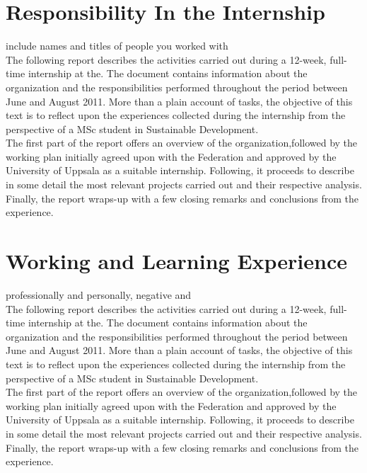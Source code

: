 \documentclass[12pt,onecolumn]{IEEEtran}
\begin{document}
\newpage
\section{\textbf{Responsibility In the Internship}}
include names and titles of people you worked with\\

The following report describes the activities carried out during a 12-week, full-time internship at the. The document contains information about the organization and the responsibilities performed throughout the period between June and August 2011. More than a plain account of tasks, the objective of this text is to reflect upon the experiences collected during the internship from the perspective of a MSc student in
Sustainable Development.\\

The first part of the report offers an overview of the organization,followed by the working plan initially agreed upon with the Federation and approved by the University of Uppsala as a suitable internship. Following, it proceeds to describe in some detail the most relevant projects carried out and their respective analysis. Finally, the report
wraps-up with a few closing remarks and conclusions from the experience.

\newpage
\section{\textbf{Working and Learning Experience}}
professionally and personally, negative and \cite{fraud}\\

The following report describes the activities carried out during a 12-week, full-time internship at the. The document contains information about the organization and the responsibilities performed throughout the period between June and August 2011. More than a plain account of tasks, the objective of this text is to reflect upon the experiences collected during the internship from the perspective of a MSc student in
Sustainable Development.\\

The first part of the report offers an overview of the organization,followed by the working plan initially agreed upon with the Federation and approved by the University of Uppsala as a suitable internship. Following, it proceeds to describe in some detail the most relevant projects carried out and their respective analysis. Finally, the report
wraps-up with a few closing remarks and conclusions from the experience.
\end{document}
